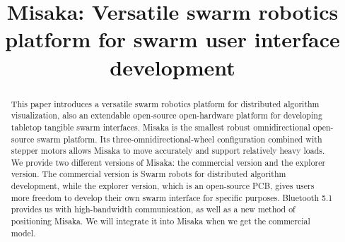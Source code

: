 \documentclass[sigconf]{acmart}
\begin{document}
\title{Misaka: Versatile swarm robotics platform for swarm user interface development}







\begin{abstract}
  This paper introduces a versatile swarm robotics platform for distributed algorithm visualization, also an extendable open-source open-hardware platform for developing tabletop tangible swarm interfaces. 
  Misaka is the smallest robust omnidirectional open-source swarm platform. Its three-omnidirectional-wheel configuration combined with stepper motors allows Misaka to move accurately and support relatively heavy loads.
  We provide two different versions of Misaka: the commercial version and the explorer version. The commercial version is Swarm robots for distributed algorithm development, while the explorer version, which is an open-source PCB, gives users more freedom to develop their own swarm interface for specific purposes.
  Bluetooth 5.1 provides us with high-bandwidth communication, as well as a new method of positioning Misaka. We will integrate it into Misaka when we get the commercial model.


\end{abstract}
\end{document}
